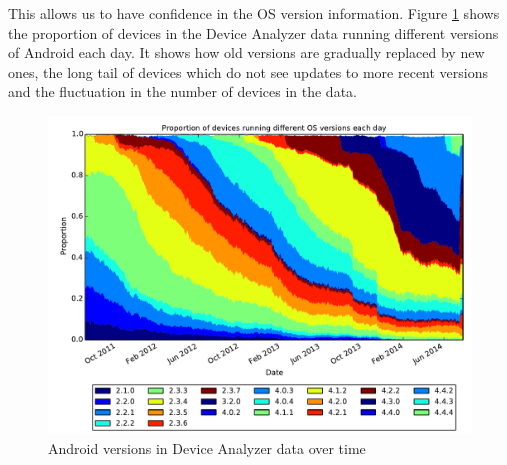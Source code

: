 \documentclass[conference,a4paper,twoside]{IEEEtran}
\begin{document}
This allows us to have confidence in the OS version information.
Figure \ref{fig:norm_os} shows the proportion of devices in the Device Analyzer data running different versions of Android each day.
It shows how old versions are gradually replaced by new ones, the long tail of devices which do not see updates to more recent versions and the fluctuation in the number of devices in the data.
\begin{figure}
 \centering
 \includegraphics[width=\columnwidth]{figures/da_norm_os}
 \caption{Android versions in Device Analyzer data over time}
 \label{fig:norm_os}
\end{figure}
\end{document}
